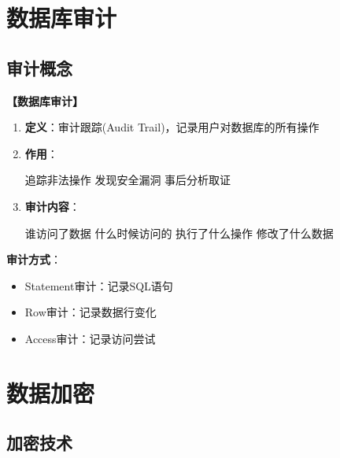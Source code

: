 \documentclass[12pt, a4paper]{article}
\newenvironment{bluebox}[1]{%
  \begin{trivlist}
  \item[\hskip\labelsep \textbf{#1}]
  \setlength{\parskip}{0.5ex}
  \setlength{\itemsep}{0.5ex}
}{%
  \end{trivlist}
}
\begin{document}
\section{数据库审计}

\subsection{审计概念}

\begin{bluebox}{审计机制}
	\textbf{【数据库审计】}

	\begin{enumerate}[leftmargin=*, label=\textbf{\arabic*.}]
		\item \textbf{定义}：审计跟踪(Audit Trail)，记录用户对数据库的所有操作
		\item \textbf{作用}：
		      \begin{itemize}
			      追踪非法操作
			      发现安全漏洞
			      事后分析取证
		      \end{itemize}
		\item \textbf{审计内容}：
		      \begin{itemize}
			      谁访问了数据
			      什么时候访问的
			      执行了什么操作
			      修改了什么数据
		      \end{itemize}
	\end{enumerate}

	\textbf{审计方式}：
	\begin{itemize}
		\item Statement审计：记录SQL语句
		\item Row审计：记录数据行变化
		\item Access审计：记录访问尝试
	\end{itemize}
\end{bluebox}

\section{数据加密}

\subsection{加密技术}
\end{document}
